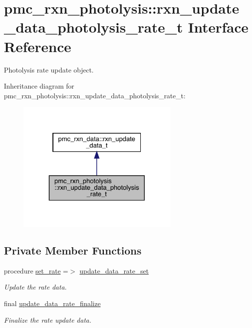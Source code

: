 \hypertarget{structpmc__rxn__photolysis_1_1rxn__update__data__photolysis__rate__t}{}\section{pmc\+\_\+rxn\+\_\+photolysis\+:\+:rxn\+\_\+update\+\_\+data\+\_\+photolysis\+\_\+rate\+\_\+t Interface Reference}
\label{structpmc__rxn__photolysis_1_1rxn__update__data__photolysis__rate__t}


Photolysis rate update object.  




Inheritance diagram for pmc\+\_\+rxn\+\_\+photolysis\+:\+:rxn\+\_\+update\+\_\+data\+\_\+photolysis\+\_\+rate\+\_\+t\+:\nopagebreak
\begin{figure}[H]
\begin{center}
\leavevmode
\includegraphics[width=227pt]{structpmc__rxn__photolysis_1_1rxn__update__data__photolysis__rate__t__inherit__graph}
\end{center}
\end{figure}
\subsection*{Private Member Functions}
\begin{DoxyCompactItemize}
\item 
procedure \mbox{\hyperlink{structpmc__rxn__photolysis_1_1rxn__update__data__photolysis__rate__t_ad3fc3753c203b145c225b48b853b02d7}{set\+\_\+rate}} =$>$ \mbox{\hyperlink{namespacepmc__rxn__photolysis_a83d27d14ea7ff279329cc7cad6cd616c}{update\+\_\+data\+\_\+rate\+\_\+set}}
\begin{DoxyCompactList}\small\item\em Update the rate data. \end{DoxyCompactList}\item 
final \mbox{\hyperlink{structpmc__rxn__photolysis_1_1rxn__update__data__photolysis__rate__t_ad6bf3d323040f1e90516df6ea1ec6cf4}{update\+\_\+data\+\_\+rate\+\_\+finalize}}
\begin{DoxyCompactList}\small\item\em Finalize the rate update data. \end{DoxyCompactList}\end{DoxyCompactItemize}

